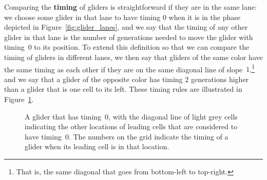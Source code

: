 Comparing the \textbf{timing} of gliders is straightforward if they are in the same lane: we choose some glider in that lane to have timing $0$ when it is in the phase depicted in Figure~\ref{fig:glider_lanes}, and we say that the timing of any other glider in that lane is the number of generations needed to move the glider with timing~$0$ to its position. To extend this definition so that we can compare the timing of gliders in different lanes, we then say that gliders of the same color have the same timing as each other if they are on the same diagonal line of slope~$1$,\footnote{That is, the same diagonal that goes from bottom-left to top-right.} and we say that a glider of the opposite color has timing $2$ generations higher than a glider that is one cell to its left. These timing rules are illustrated in Figure~\ref{fig:glider_timings}.

\begin{figure}[!htb]
	\centering
	\caption{A glider that has timing~$0$, with the diagonal line of light grey cells indicating the other locations of leading cells that are considered to have timing~$0$. The numbers on the grid indicate the timing of a glider when its leading cell is in that location.}\label{fig:glider_timings}
\end{figure}

